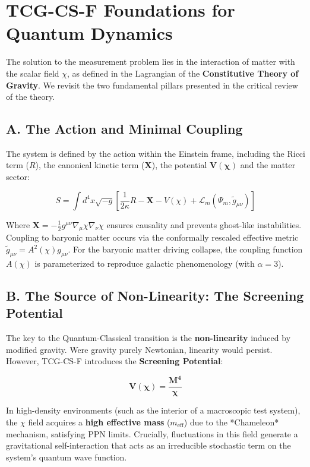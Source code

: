 \documentclass[11pt, a4paper]{article}
\begin{document}
\section{TCG-CS-F Foundations for Quantum Dynamics}

The solution to the measurement problem lies in the interaction of matter with the scalar field $\chi$, as defined in the Lagrangian of the \textbf{Constitutive Theory of Gravity}. We revisit the two fundamental pillars presented in the critical review of the theory.

\subsection{A. The Action and Minimal Coupling}

The system is defined by the action within the Einstein frame, including the Ricci term ($R$), the canonical kinetic term ($\mathbf{X}$), the potential $\mathbf{V(\chi)}$ and the matter sector:

\begin{equation}
    S = \int d^4x \sqrt{-g} \left[ \frac{1}{2\kappa} R - \mathbf{X} - V(\chi) + \mathcal{L}_m (\Psi_m, \tilde{g}_{\mu\nu}) \right]
\end{equation}

Where $\mathbf{X} = -\frac{1}{2}g^{\mu\nu}\nabla_\mu\chi\nabla_\nu\chi$ ensures causality and prevents ghost-like instabilities. Coupling to baryonic matter occurs via the conformally rescaled effective metric $\tilde{g}_{\mu\nu} = A^2(\chi) g_{\mu\nu}$. For the baryonic matter driving collapse, the coupling function $A(\chi)$ is parameterized to reproduce galactic phenomenology (with $\alpha=3$).

\subsection{\texorpdfstring{B. The Source of Non-Linearity: The Screening Potential}{B. The Source of Non-Linearity: The Screening Potential}} 

The key to the Quantum-Classical transition is the \textbf{non-linearity} induced by modified gravity. Were gravity purely Newtonian, linearity would persist. However, TCG-CS-F introduces the \textbf{Screening Potential}:

\begin{equation}
    \mathbf{V(\chi) = \frac{M^4}{\chi}}
\end{equation}

In high-density environments (such as the interior of a macroscopic test system), the $\chi$ field acquires a \textbf{high effective mass} ($m_{\text{eff}}$) due to the *Chameleon* mechanism, satisfying PPN limits. Crucially, fluctuations in this field generate a gravitational self-interaction that acts as an irreducible stochastic term on the system's quantum wave function.
\end{document}
